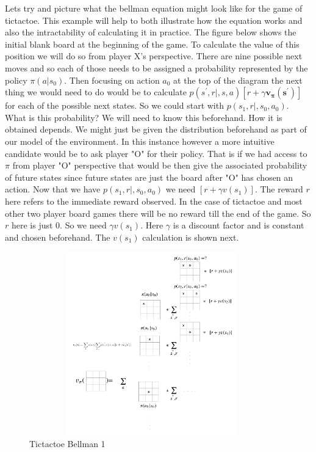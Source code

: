Lets try and picture what the bellman equation might look like for the game of tictactoe. This example will help to both illustrate how the equation works and also the intractability of calculating it in practice. The figure below shows the initial blank board at the beginning of the game. To calculate the value of this position we will do so from player X's perspective. There are nine possible next moves and so each of those needs to be assigned a probability represented by the policy $\pi(a | s_{0})$. Then focusing on action $a_{0}$ at the top of the diagram the next thing we would need to do would be to calculate $p(s^{'},r|,s,a)[ r + \gamma \mathbf{v_{\pi}(s^{'})}]$ for each of the possible next states. So we could start with $p(s_{1},r|,s_{0},a_{0})$. What is this probability? We will need to know this beforehand. How it is obtained depends. We might just be given the distribution beforehand as part of our model of the environment. In this instance however a more intuitive candidate would be to ask player "O" for their policy. That is if we had access to $\pi$ from player "O" perspective that would be then give the associated probability of future states since future states are just the board after "O" has chosen an action. Now that we have $p(s_{1},r|,s_{0},a_{0})$ we need $[r + \gamma v(s_{1})]$. The reward $r$ here refers to the immediate reward observed. In the case of tictactoe and most other two player board games there will be no reward till the end of the game. So $r$ here is just 0. So we need $\gamma v(s_{1})$. Here $\gamma$ is a discount factor and is constant and chosen beforehand. The $v(s_{1})$ calculation is shown next. 

\begin{figure}[H]
        \centering
        \includegraphics[width=400px,height=300px]{images/PolicyEvaluationExample/intractable_value_function.png}
        \caption{Tictactoe Bellman 1}
        \label{fig:tictactoe-dp}
\end{figure}

